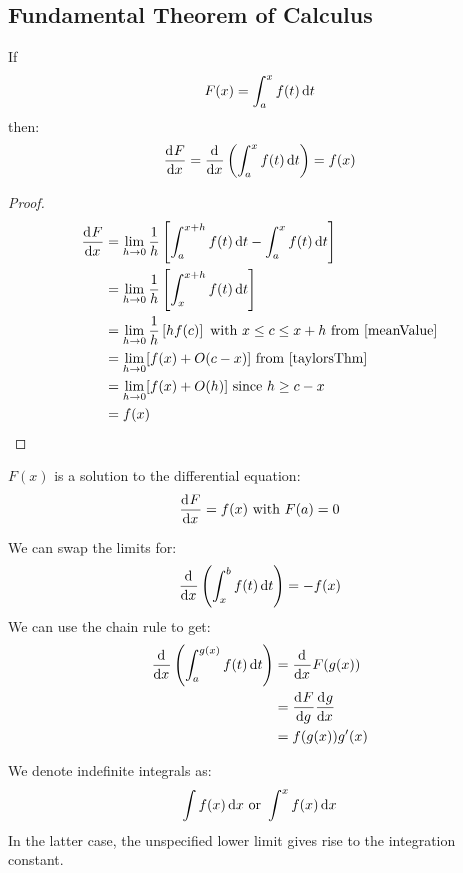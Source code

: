 \documentclass[../main.tex]{subfiles}
\begin{document}
\subsection{Fundamental Theorem of Calculus}
\begin{theorem}
  If
  \[
    F(x) = \int_{a}^{x} f(t) \,\mathrm{d} t
  \]
  then:
  \[
    \deriv{F}{x} = \deriv{}{x}\left(\int_{a}^{x} f(t) \d{t}\right) = f(x)
  \]
\end{theorem}
\begin{proof}
  \begin{align*}
    \deriv{F}{x} &= \lim_{h \to 0} \frac{1}{h} \left[\int_{a}^{x+h} f(t) \d{t} - \int_{a}^{x} f(t) \d{t}\right] \\
                 &= \lim_{h \to 0} \frac{1}{h} \left[\int_{x}^{x+h} f(t) \d{t}\right] \\
                 &= \lim_{h \to 0} \frac{1}{h} \left[hf(c)\right] \text{ with } x \leq c \leq x + h \text{ from \cref{meanValue}} \\
                 &= \lim_{h \to 0} [f(x) + O(c-x)] \text{ from \cref{taylorsThm}} \\
                 &=\lim_{h \to 0} [f(x) + O(h)] \text{ since $h \geq c-x$} \\
                 &= f(x)
  \end{align*}
\end{proof}
\begin{remark}[Note]
  $F(x)$ is a solution to the differential equation:
  \[
    \deriv{F}{x} = f(x) \text{ with } F(a) = 0
  \]
\end{remark}
\begin{corollary}
  We can swap the limits for:
  \[
    \deriv{}{x}\left(\int_{x}^{b} f(t) \d{t}\right) = -f(x)
  \]
  We can use the chain rule to get:
  \begin{align*}
    \deriv{}{x}\left(\int_{a}^{g(x)} f(t) \d{t}\right) &= \deriv{}{x}F(g(x)) \\
                                            &= \deriv{F}{g} \deriv{g}{x} \\
                                            &= f(g(x)) g'(x)
  \end{align*}
\end{corollary}
\begin{remark}[Notation]
  We denote indefinite integrals as:
  \[
    \int f(x) \,\mathrm{d} x \text{ or } \int_{}^{x} f(x) \,\mathrm{d} x
  \]
  In the latter case, the unspecified lower limit gives rise to the integration constant.
\end{remark}
\end{document}
